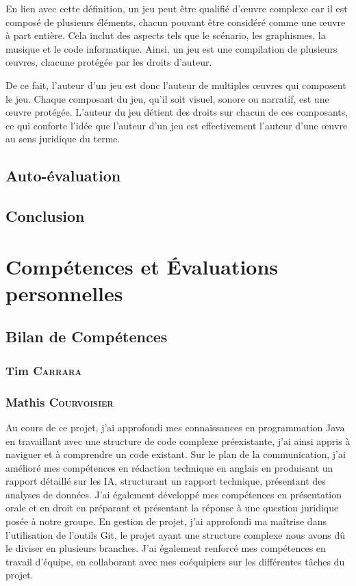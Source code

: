 En lien avec cette définition, un jeu peut être qualifié d'œuvre complexe car il est composé de plusieurs éléments, chacun pouvant être considéré comme une œuvre à part entière. Cela inclut des aspects tels que le scénario, les graphismes, la musique et le code informatique. Ainsi, un jeu est une compilation de plusieurs œuvres, chacune protégée par les droits d'auteur.

De ce fait, l'auteur d'un jeu est donc l'auteur de multiples œuvres qui composent le jeu. Chaque composant du jeu, qu'il soit visuel, sonore ou narratif, est une œuvre protégée. L'auteur du jeu détient des droits sur chacun de ces composants, ce qui conforte l'idée que l'auteur d'un jeu est effectivement l'auteur d'une œuvre au sens juridique du terme.

\section{Auto-évaluation}



\section{Conclusion}


\appendix

\chapter{Compétences et Évaluations personnelles}

\setcounter{page}{1}
\renewcommand{\thepage}{\Roman{page}}


\section{Bilan de Compétences}

\subsection*{Tim \textsc{Carrara}}

\subsection*{Mathis \textsc{Courvoisier}}

Au cours de ce projet, j'ai approfondi mes connaissances en programmation Java en travaillant avec une structure de code complexe préexistante, j'ai ainsi appris à naviguer et à comprendre un code existant. Sur le plan de la communication, j'ai amélioré mes compétences en rédaction technique en anglais en produisant un rapport détaillé sur les IA, structurant un rapport technique, présentant des analyses de données. J'ai également développé mes compétences en présentation orale et en droit en préparant et présentant la réponse à une question juridique posée à notre groupe. En gestion de projet, j'ai approfondi ma maîtrise dans l’utilisation de l’outils Git, le projet ayant une structure complexe nous avons dû le diviser en plusieurs branches. J'ai également renforcé mes compétences en travail d'équipe, en collaborant avec mes coéquipiers sur les différentes tâches du projet.

